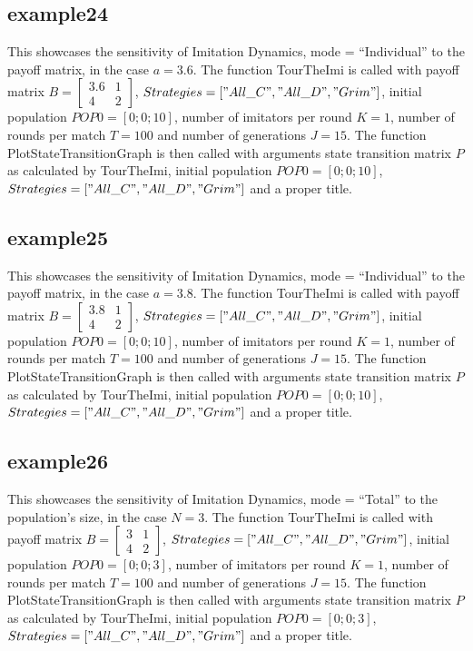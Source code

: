 \subsection{example24}
This showcases the sensitivity of Imitation Dynamics, mode = ``Individual'' to the payoff matrix, in the case $a = 3.6$. The function TourTheImi is called with payoff matrix $B = \begin{bmatrix} 3.6 & 1 \\ 4 & 2 \end{bmatrix}$, $Strategies = ["All\_C", "All\_D", "Grim"]$, initial population $POP0 = [0; 0; 10]$, number of imitators per round $K=1$, number of rounds per match $T = 100$ and number of generations $J = 15$. The function PlotStateTransitionGraph is then called with arguments state transition matrix $P$ as calculated by TourTheImi, initial population $POP0 = [0; 0; 10]$, $Strategies = ["All\_C", "All\_D", "Grim"]$ and a proper title.

\subsection{example25}
This showcases the sensitivity of Imitation Dynamics, mode = ``Individual'' to the payoff matrix, in the case $a = 3.8$. The function TourTheImi is called with payoff matrix $B = \begin{bmatrix} 3.8 & 1 \\ 4 & 2 \end{bmatrix}$, $Strategies = ["All\_C", "All\_D", "Grim"]$, initial population $POP0 = [0; 0; 10]$, number of imitators per round $K=1$, number of rounds per match $T = 100$ and number of generations $J = 15$. The function PlotStateTransitionGraph is then called with arguments state transition matrix $P$ as calculated by TourTheImi, initial population $POP0 = [0; 0; 10]$, $Strategies = ["All\_C", "All\_D", "Grim"]$ and a proper title.

\subsection{example26}
This showcases the sensitivity of Imitation Dynamics, mode = ``Total'' to the population's size, in the case $N=3$. The function TourTheImi is called with payoff matrix $B = \begin{bmatrix} 3 & 1 \\ 4 & 2 \end{bmatrix}$, $Strategies = ["All\_C", "All\_D", "Grim"]$, initial population $POP0 = [0; 0; 3]$, number of imitators per round $K=1$, number of rounds per match $T = 100$ and number of generations $J = 15$. The function PlotStateTransitionGraph is then called with arguments state transition matrix $P$ as calculated by TourTheImi, initial population $POP0 = [0; 0; 3]$, $Strategies = ["All\_C", "All\_D", "Grim"]$ and a proper title.

